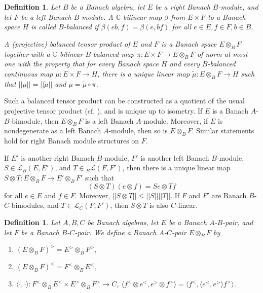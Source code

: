 \documentclass[a4,11pt]{amsart}
\newtheorem{defn}[thm]{Definition}
\theoremstyle{remark}
\newtheorem{rem}[thm]{Remark}
\begin{document}



\begin{defn}
Let $B$ be a Banach algebra, let $E$ be a right Banach $B$-module, and let $F$ be a left Banach $B$-module. A $\mathbb{C}$-bilinear map $\beta$ from $E\times F$ to a Banach space $H$ is called $B$-balanced if $\beta(eb,f)=\beta(e,bf)$ for all $e\in E,f\in F,b\in B$.

A (projective) balanced tensor product of $E$ and $F$ is a Banach space $E\otimes_BF$ together with a $\mathbb{C}$-bilinear $B$-balanced map $\pi:E\times F\rightarrow E\otimes_BF$ of norm at most one with the property that for every Banach space $H$ and every $B$-balanced continuous map $\mu:E\times F\rightarrow H$, there is a unique linear map $\tilde{\mu}:E\otimes_BF\rightarrow H$ such that $||\mu||=||\tilde{\mu}||$ and $\mu=\tilde{\mu}\circ\pi$.
\end{defn}



Such a balanced tensor product can be constructed as a quotient of the usual projective tensor product (cf. \cite[p.11]{Laf02}), and is unique up to isometry.
If $E$ is a Banach $A$-$B$-bimodule, then $E\otimes_BF$ is a left Banach $A$-module. Moreover, if $E$ is nondegenerate as a left Banach $A$-module, then so is $E\otimes_BF$. Similar statements hold for right Banach module structures on $F$.

If $E'$ is another right Banach $B$-module, $F'$ is another left Banach $B$-module, $S\in\mathcal{L}_B(E,E')$, and $T\in {}_B\mathcal{L}(F,F')$, then there is a unique linear map $S\otimes T:E\otimes_B F\rightarrow E'\otimes_B F'$ such that 
\[(S\otimes T)(e\otimes f)=Se\otimes Tf\] for all $e\in E$ and $f\in F$. Moreover, $||S\otimes T||\leq ||S||||T||$.
If $F$ and $F'$ are Banach $B$-$C$-bimodules, and $T\in\mathcal{L}_C(F,F')$, then $S\otimes T$ is also $C$-linear.

\begin{defn}
Let $A,B,C$ be Banach algebras, let $E$ be a Banach $A$-$B$-pair, and let $F$ be a Banach $B$-$C$-pair. We define a Banach $A$-$C$-pair $E\otimes_B F$ by
\begin{enumerate}
\item $(E\otimes_B F)^>=E^>\otimes_B F^>$,
\item $(E\otimes_B F)^<=F^<\otimes_B E^<$,
\item $\langle \cdot,\cdot \rangle:F^<\otimes_B E^<\times E^>\otimes_B F^>\rightarrow C$, $\langle f^<\otimes e^<,e^>\otimes f^> \rangle=\langle f^<,\langle e^<,e^> \rangle f^> \rangle$.
\end{enumerate}
\end{defn}
\end{document}
